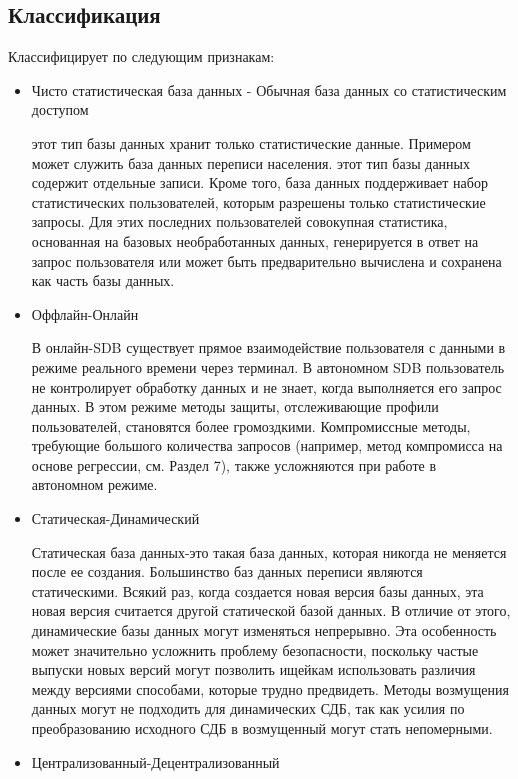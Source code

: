 \subsection{Классификация}
Классифицирует по следующим признакам:
\begin{itemize}

    \item Чисто статистическая база данных - Обычная база данных со статистическим доступом

этот тип базы данных хранит только статистические данные. Примером может служить база данных переписи населения.
этот тип базы данных содержит отдельные записи. Кроме того, база данных поддерживает набор статистических пользователей, которым разрешены только статистические запросы. Для этих последних пользователей совокупная статистика, основанная на базовых необработанных данных, генерируется в ответ на запрос пользователя или может быть предварительно вычислена и сохранена как часть базы данных.

    \item Оффлайн-Онлайн

В онлайн-SDB существует прямое взаимодействие пользователя с данными в режиме реального времени через терминал. В автономном SDB пользователь не контролирует обработку данных и не знает, когда выполняется его запрос данных. В этом режиме методы защиты, отслеживающие профили пользователей, становятся более громоздкими. Компромиссные методы, требующие большого количества запросов (например, метод компромисса на основе регрессии, см. Раздел 7), также усложняются при работе в автономном режиме.

    \item Статическая-Динамический

Статическая база данных-это такая база данных, которая никогда не меняется после ее создания. Большинство баз данных переписи являются статическими. Всякий раз, когда создается новая версия базы данных, эта новая версия считается другой статической базой данных. В отличие от этого, динамические базы данных могут изменяться непрерывно. Эта особенность может значительно усложнить проблему безопасности, поскольку частые выпуски новых версий могут позволить ищейкам использовать различия между версиями способами, которые трудно предвидеть. Методы возмущения данных могут не подходить для динамических СДБ, так как усилия по преобразованию исходного СДБ в возмущенный могут стать непомерными.

    \item Централизованный-Децентрализованный


\end{itemize}
